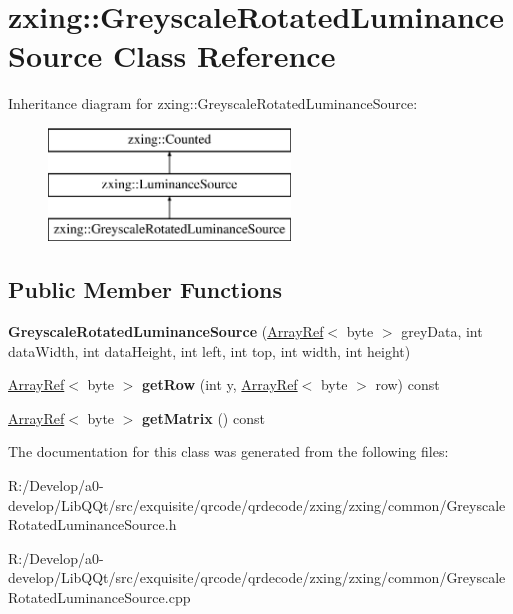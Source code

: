 \hypertarget{classzxing_1_1_greyscale_rotated_luminance_source}{}\section{zxing\+:\+:Greyscale\+Rotated\+Luminance\+Source Class Reference}
\label{classzxing_1_1_greyscale_rotated_luminance_source}
Inheritance diagram for zxing\+:\+:Greyscale\+Rotated\+Luminance\+Source\+:\begin{figure}[H]
\begin{center}
\leavevmode
\includegraphics[height=3.000000cm]{classzxing_1_1_greyscale_rotated_luminance_source}
\end{center}
\end{figure}
\subsection*{Public Member Functions}
\begin{DoxyCompactItemize}
\item 
\mbox{\label{classzxing_1_1_greyscale_rotated_luminance_source_aad44c357c70506cfd2938c8f8184f7c7}} 
{\bfseries Greyscale\+Rotated\+Luminance\+Source} (\mbox{\hyperlink{classzxing_1_1_array_ref}{Array\+Ref}}$<$ byte $>$ grey\+Data, int data\+Width, int data\+Height, int left, int top, int width, int height)
\item 
\mbox{\label{classzxing_1_1_greyscale_rotated_luminance_source_a5d5ee279ed7287fa0c317459b5cf18e4}} 
\mbox{\hyperlink{classzxing_1_1_array_ref}{Array\+Ref}}$<$ byte $>$ {\bfseries get\+Row} (int y, \mbox{\hyperlink{classzxing_1_1_array_ref}{Array\+Ref}}$<$ byte $>$ row) const
\item 
\mbox{\label{classzxing_1_1_greyscale_rotated_luminance_source_ab326ed2c6d22aa8739f1445677d485f6}} 
\mbox{\hyperlink{classzxing_1_1_array_ref}{Array\+Ref}}$<$ byte $>$ {\bfseries get\+Matrix} () const
\end{DoxyCompactItemize}


The documentation for this class was generated from the following files\+:\begin{DoxyCompactItemize}
\item 
R\+:/\+Develop/a0-\/develop/\+Lib\+Q\+Qt/src/exquisite/qrcode/qrdecode/zxing/zxing/common/Greyscale\+Rotated\+Luminance\+Source.\+h\item 
R\+:/\+Develop/a0-\/develop/\+Lib\+Q\+Qt/src/exquisite/qrcode/qrdecode/zxing/zxing/common/Greyscale\+Rotated\+Luminance\+Source.\+cpp\end{DoxyCompactItemize}
